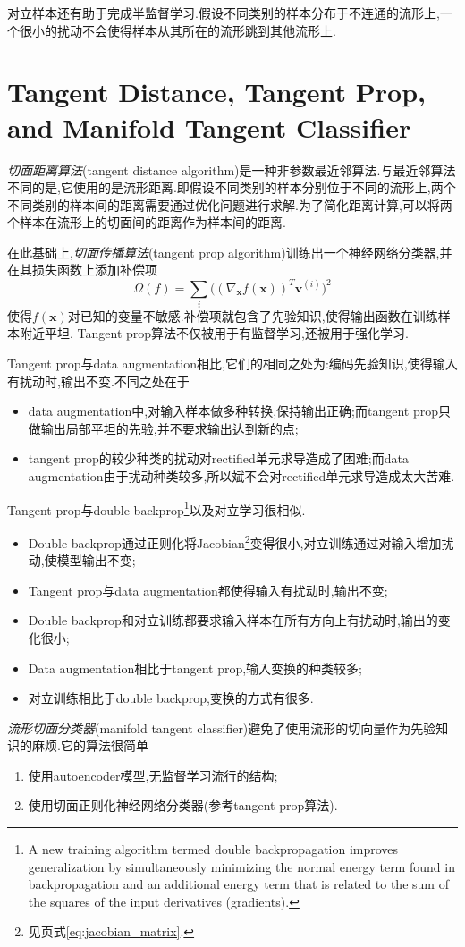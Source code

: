 对立样本还有助于完成半监督学习.假设不同类别的样本分布于不连通的流形上,一个很小的扰动不会使得样本从其所在的流形跳到其他流形上.

\section{Tangent Distance, Tangent Prop, and Manifold Tangent Classifier}

\textit{切面距离算法}(tangent distance algorithm)是一种非参数最近邻算法.与最近邻算法不同的是,它使用的是流形距离.即假设不同类别的样本分别位于不同的流形上,两个不同类别的样本间的距离需要通过优化问题进行求解.为了简化距离计算,可以将两个样本在流形上的切面间的距离作为样本间的距离.

在此基础上,\textit{切面传播算法}(tangent prop algorithm)训练出一个神经网络分类器,并在其损失函数上添加补偿项
\begin{equation}
\Omega(f)=\sum_i\Big((\nabla_{\mathbf x}f(\mathbf x))^T\mathbf v^{(i)}\Big)^2
\end{equation}
使得$f(\mathbf x)$对已知的变量不敏感.补偿项就包含了先验知识,使得输出函数在训练样本附近平坦. Tangent prop算法不仅被用于有监督学习,还被用于强化学习.

Tangent prop与data augmentation相比,它们的相同之处为:编码先验知识,使得输入有扰动时,输出不变.不同之处在于
\begin{itemize}
    \item data augmentation中,对输入样本做多种转换,保持输出正确;而tangent prop只做输出局部平坦的先验,并不要求输出达到新的点;
    \item tangent prop的较少种类的扰动对rectified单元求导造成了困难;而data augmentation由于扰动种类较多,所以斌不会对rectified单元求导造成太大苦难.
\end{itemize}

Tangent prop与double backprop\footnote{A new training algorithm termed double backpropagation improves generalization by simultaneously minimizing the normal energy term found in backpropagation and an additional energy term that is related to the sum of the squares of the input derivatives (gradients).}以及对立学习很相似.
\begin{itemize}
    \item Double backprop通过正则化将Jacobian\footnote{见\pageref{eq:jacobian_matrix}页式\ref{eq:jacobian_matrix}.}变得很小,对立训练通过对输入增加扰动,使模型输出不变;
    \item Tangent prop与data augmentation都使得输入有扰动时,输出不变;
    \item Double backprop和对立训练都要求输入样本在所有方向上有扰动时,输出的变化很小;
    \item Data augmentation相比于tangent prop,输入变换的种类较多;
    \item 对立训练相比于double backprop,变换的方式有很多.
\end{itemize}

\textit{流形切面分类器}(manifold tangent classifier)避免了使用流形的切向量作为先验知识的麻烦.它的算法很简单
\begin{enumerate}
    \item 使用autoencoder模型,无监督学习流行的结构;
    \item 使用切面正则化神经网络分类器(参考tangent prop算法).
\end{enumerate}